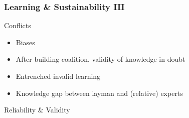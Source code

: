 \begin{frame}
	\frametitle{Learning \& Sustainability III}
	\begin{block}{Conflicts}
		\begin{itemize}
			\item Biases \citep[e.g.,][]{Makov2016}
			\item After building coalition, validity of knowledge in doubt \citep[e.g.,][]{Aronczyk2019,Wright2017}
			\item Entrenched invalid learning \citep[e.g.,][]{Boudet2020}
			\item Knowledge gap between layman and (relative) experts \citep[e.g.,][]{Camilleri2019}
		\end{itemize}
	\end{block}
\end{frame}

\blackgroup
\begin{frame}[plain]
\end{frame}
\egroup

\blackgroup
\begin{frame}[plain]
	Reliability \& Validity
\end{frame}
\egroup
